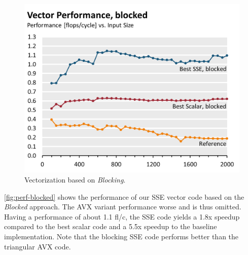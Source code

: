 \begin{figure}[htb]\centering
  \includegraphics[width=\linewidth]{plot_data/blocked_vector_performance.png}
  \caption{Vectorization based on \emph{Blocking}.}
  \label{fig:perf-blocked}
\end{figure}
\autoref{fig:perf-blocked} shows the performance of our SSE vector code
based on the \emph{Blocked} approach. The AVX variant performance worse and
is thus omitted. Having a performance of about 1.1 fl/c, the SSE code
yields a 1.8x speedup compared to the best scalar code and a 5.5x speedup
to the baseline implementation. Note that the blocking SSE code performs
better than the triangular AVX code.

